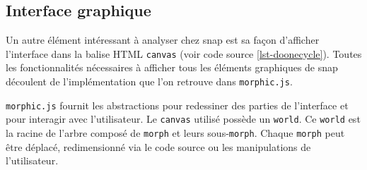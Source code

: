 %
%
%

\subsection{Interface graphique}
Un autre élément intéressant à analyser chez \gls{snap} est sa façon d'afficher l'interface dans la balise HTML \texttt{canvas} (voir code source \ref{lst-doonecycle}). Toutes les fonctionnalités nécessaires à afficher tous les éléments graphiques de \gls{snap} découlent de l'implémentation que l'on retrouve dans \texttt{morphic.js}.

\texttt{morphic.js} fournit les abstractions pour redessiner des parties de l'interface et pour interagir avec l'utilisateur. Le \texttt{canvas} utilisé possède un \texttt{world}. Ce \texttt{world} est la racine de l'arbre composé de \texttt{morph} et leurs sous-\texttt{morph}. Chaque \texttt{morph} peut être déplacé, redimensionné via le code source ou les manipulations de l'utilisateur.

